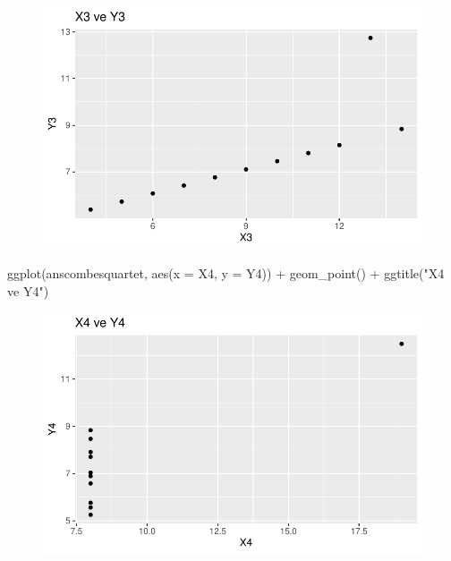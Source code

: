 \documentclass[
  letterpaper,
  DIV=11,
  numbers=noendperiod]{scrartcl}
\newenvironment{Shaded}{\begin{snugshade}}{\end{snugshade}}
\newcommand{\AttributeTok}[1]{\textcolor[rgb]{0.40,0.45,0.13}{#1}}
\newcommand{\FunctionTok}[1]{\textcolor[rgb]{0.28,0.35,0.67}{#1}}
\newcommand{\NormalTok}[1]{\textcolor[rgb]{0.00,0.23,0.31}{#1}}
\newcommand{\SpecialCharTok}[1]{\textcolor[rgb]{0.37,0.37,0.37}{#1}}
\newcommand{\StringTok}[1]{\textcolor[rgb]{0.13,0.47,0.30}{#1}}
\begin{document}
\begin{figure}[H]

{\centering \includegraphics{4_hafta_tanimlayici_istatistik_files/figure-pdf/unnamed-chunk-26-3.pdf}

}

\end{figure}

\begin{Shaded}
\begin{Highlighting}[]
\FunctionTok{ggplot}\NormalTok{(anscombesquartet, }\FunctionTok{aes}\NormalTok{(}\AttributeTok{x =}\NormalTok{ X4, }\AttributeTok{y =}\NormalTok{ Y4)) }\SpecialCharTok{+} 
  \FunctionTok{geom\_point}\NormalTok{() }\SpecialCharTok{+} 
  \FunctionTok{ggtitle}\NormalTok{(}\StringTok{"X4 ve Y4"}\NormalTok{)}
\end{Highlighting}
\end{Shaded}

\begin{figure}[H]

{\centering \includegraphics{4_hafta_tanimlayici_istatistik_files/figure-pdf/unnamed-chunk-26-4.pdf}

}

\end{figure}
\end{document}

